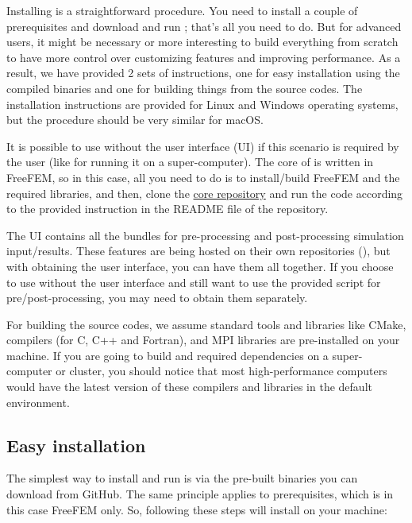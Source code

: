 Installing \biodeg{} is a straightforward procedure. You need to install a couple of prerequisites and download and run \biodeg{}; that's all you need to do. But for advanced users, it might be necessary or more interesting to build everything from scratch to have more control over customizing features and improving performance. As a result, we have provided 2 sets of instructions, one for easy installation using the compiled binaries and one for building things from the source codes. The installation instructions are provided for Linux and Windows operating systems, but the procedure should be very similar for macOS. 

It is possible to use \biodeg{} without the user interface (UI) if this scenario is required by the user (like for running it on a super-computer). The core of \biodeg{} is written in FreeFEM, so in this case, all you need to do is to install/build FreeFEM and the required libraries, and then, clone the \href{https://github.com/mbarzegary/BioDeg}{\biodeg{} core repository} and run the code according to the provided instruction in the README file of the repository.

The \biodeg{} UI contains all the bundles for pre-processing and post-processing simulation input/results. These features are being hosted on their own repositories (), but with obtaining the user interface, you can have them all together. If you choose to use \biodeg{} without the user interface and still want to use the provided script for pre/post-processing, you may need to obtain them separately.

For building the source codes, we assume standard tools and libraries like CMake, compilers (for C, C++ and Fortran), and MPI libraries are pre-installed on your machine. If you are going to build \biodeg{} and required dependencies on a super-computer or cluster, you should notice that most high-performance computers would have the latest version of these compilers and libraries in the default environment.

\subsection{Easy installation}

The simplest way to install and run \biodeg{} is via the pre-built binaries you can download from GitHub. The same principle applies to prerequisites, which is in this case FreeFEM only. So, following these steps will install \biodeg{} on your machine:


